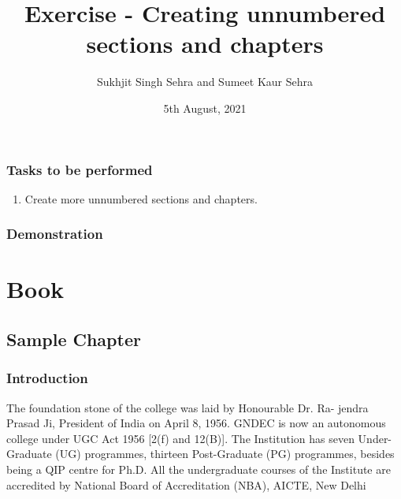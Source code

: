 \documentclass[a4paper,12pt,twoside]{book}
\title{Exercise - Creating  unnumbered sections and chapters}
\author{Sukhjit Singh Sehra and Sumeet Kaur Sehra}
\date{5th August, 2021}
\begin{document}
	\maketitle	
	\section*{Tasks to be performed}
	\begin{enumerate}	
		\item Create more unnumbered sections and chapters.
	\end{enumerate}
	\section*{Demonstration}
	\part*{Book}
\chapter*{Sample Chapter}
\section*{Introduction}
The foundation stone of the college was laid by Honourable Dr. Ra-
jendra Prasad Ji, President of India on April 8, 1956. GNDEC is now an
autonomous college under UGC Act 1956 [2(f) and 12(B)]. The Institution
has seven Under-Graduate (UG) programmes, thirteen Post-Graduate (PG)
programmes, besides being a QIP centre for Ph.D. All the undergraduate
courses of the Institute are accredited by National Board of Accreditation
(NBA), AICTE, New Delhi
\end{document}

